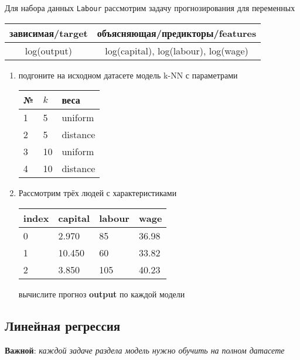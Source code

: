 \begin{exercise}
Для набора данных \texttt{Labour} рассмотрим задачу прогнозирования
для переменных
\begin{center}
	\begin{tabular}{|c|c|}\hline
		зависимая/target & объясняющая/предикторы/features \\ \hline
		log(output) & log(capital), log(labour), log(wage) \\ \hline
	\end{tabular}
\end{center}
\begin{enumerate}
	\item подгоните на исходном датасете модель k-NN с параметрами
	\begin{center}
		\begin{tabular}{|l|l|l|}\hline
		№ & \(k\) & веса \\ \hline
		1 & 5 & uniform \\
		2 & 5 & distance \\
		3 & 10 & uniform \\
		4 & 10 & distance \\ \hline
		\end{tabular}
	\end{center}
	\item Рассмотрим трёх людей с характеристиками
	\begin{center}
		\begin{tabular}{|l||l|l|l|}\hline
			index & capital & labour & wage \\ \hline\hline
			0 & 2.970 & 85 & 36.98\\
			1 & 10.450 & 60 & 33.82  \\
			2 & 3.850 & 105 & 40.23\\ \hline
		\end{tabular}
	\end{center}
	вычислите прогноз \textbf{output} по каждой модели
\end{enumerate}
\end{exercise}

\subsection{Линейная регрессия}

\textbf{Важной}: \textit{каждой задаче раздела модель нужно обучить на полном датасете}

